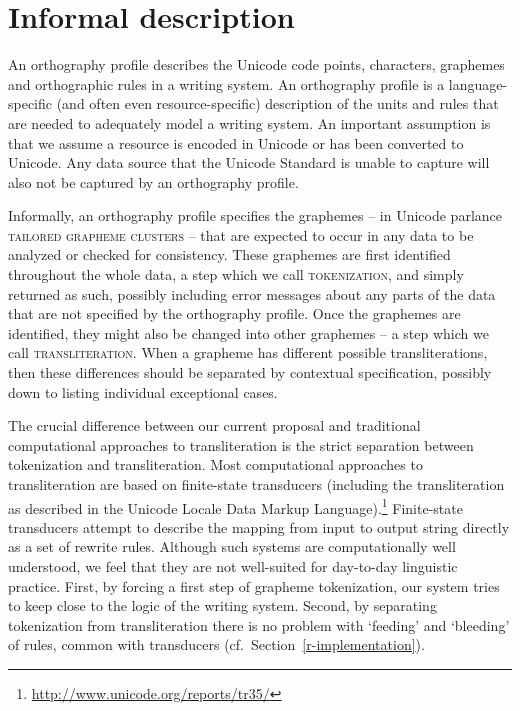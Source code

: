 \section{Informal description}
\label{informal-description-of-orthography-profiles}

An orthography profile describes the Unicode code points, characters, graphemes
and orthographic rules in a writing system. An orthography profile is a
language-specific (and often even resource-specific) description of the units
and rules that are needed to adequately model a writing system. An important
assumption is that we assume a resource is encoded in Unicode or
has been converted to Unicode. Any data source that the Unicode Standard is
unable to capture will also not be captured by an orthography profile.

Informally, an orthography profile specifies the graphemes -- in Unicode
parlance \textsc{tailored grapheme clusters} -- that are expected to occur in any
data to be analyzed or checked for consistency. These graphemes are first
identified throughout the whole data, a step which we call
\textsc{tokenization}, and simply returned as such, possibly including
error messages about any parts of the data that are not specified by the
orthography profile. Once the graphemes are identified, they might also be
changed into other graphemes -- a step which we call \textsc{transliteration}.
When a grapheme has different possible transliterations, then these differences
should be separated by contextual specification, possibly down to listing
individual exceptional cases.

The crucial difference between our current proposal and traditional
computational approaches to transliteration is the strict separation between
tokenization and transliteration. Most computational approaches to
transliteration are based on finite-state transducers (including the
transliteration as described in the Unicode Locale Data Markup
Language).\footnote{\url{http://www.unicode.org/reports/tr35/}} Finite-state 
transducers attempt to describe the mapping from input to output string directly 
as a set of rewrite rules. Although such systems are computationally well 
understood, we feel that they are not well-suited for day-to-day linguistic 
practice. First, by forcing a first step of grapheme tokenization, our system 
tries to keep close to the logic of the writing system. Second, by separating 
tokenization from transliteration there is no problem with `feeding' and 
`bleeding' of rules, common with transducers (cf.~Section~\ref{r-implementation}).

